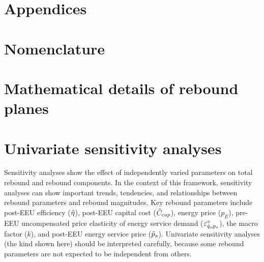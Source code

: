 \documentclass[12pt]{article}\usepackage[]{graphicx}\usepackage[]{xcolor}
\begin{document}
%
{
\scriptsize

}


\clearpage


\appendix
{}

\section*{Appendices}

\renewcommand{\thesection}{\Alph{section}}


\section{Nomenclature}
\label{sec:nomenclature}




\section{Mathematical details of rebound planes}
\label{sec:graph_details}




\section{Univariate sensitivity analyses}
\label{sec:sensitivity_analyses}



  
Sensitivity analyses show the effect of 
independently varied parameters on total rebound and rebound components.
In the context of this framework,
sensitivity analyses
can show important trends, tendencies, and relationships
between rebound parameters and rebound magnitudes.
Key rebound parameters include 
post-EEU efficiency ($\tilde{\eta}$),
post-EEU capital cost ($\tilde{C}_{cap}$),
energy price ($p_E$),
pre-EEU uncompensated price elasticity of energy service demand ($\varepsilon^\circ_{\dot{q}_s\!,p_s}$), 
the macro factor ($k$), and
post-EEU energy service price ($\tilde{p}_s$).
Univariate sensitivity analyses 
(the kind shown here)
should be interpreted carefully,
because some rebound parameters are not expected to be 
independent from others.
\end{document}
